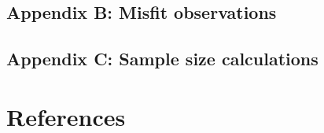\documentclass[
  authoryear,
  review,
  1p]{elsarticle}
\begin{document}
\subsection{Appendix B: Misfit observations}\label{sec-appendixB}

\subsection{Appendix C: Sample size calculations}\label{sec-appendixC}

\newpage{}

\section*{References}\label{references}

\renewcommand{\bibsection}{}

\end{document}
